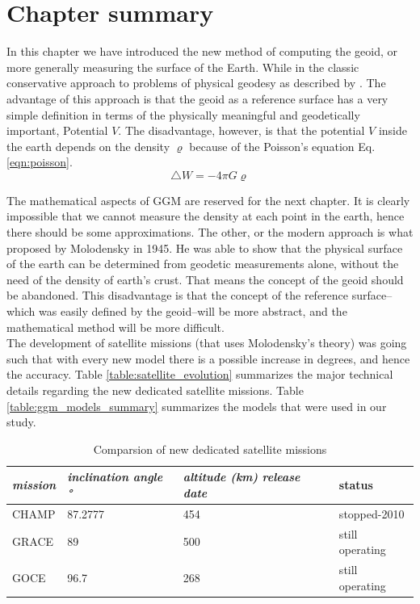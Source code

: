  
 \section{Chapter summary}
 
 In this chapter we have introduced the new method of computing the geoid, or more generally measuring the surface of the Earth. While in the classic conservative approach to problems of physical geodesy as described by \cite{hoffmann}. The advantage of this approach is that the geoid as a reference surface has a very simple definition in terms of the physically meaningful and geodetically important, Potential $V$. The disadvantage, however, is that the potential $V$ inside the earth depends on the  density $\varrho$ because of the Poisson's equation Eq. \eqref{eqn:poisson}. 
 \begin{equation}
 \label{eqn:poisson}
	 \triangle W = - 4 \pi G \varrho
 \end{equation} 
 
 The mathematical aspects of GGM are reserved for the next chapter. It is clearly impossible that we cannot measure the density at each point in the earth, hence there should be some approximations. The other, or the modern approach is what proposed by Molodensky in 1945. He was able to show that the physical surface of the earth can be determined from geodetic measurements alone, without the need of the density of earth's crust. That means the concept of the geoid should be abandoned. This disadvantage is that the concept of the reference surface--which was easily defined by the geoid--will be more abstract, and the mathematical method will be more difficult.
 \\
 The development of satellite missions (that uses Molodensky's theory) was going such that with every new model there is a possible increase in degrees, and hence the accuracy. Table \ref{table:satellite_evolution} summarizes the major technical details regarding the new dedicated satellite missions. Table \ref{table:ggm_models_summary} summarizes the models that were used in our study. 
 
 \begin{table}[]
 	\centering
 	\caption{Comparsion of new dedicated satellite missions}
 	\label{table:dedicated_satellite_missions}
 	\begin{tabular}{@{}llll@{}}
 		\toprule
 		\emph{mission} & \emph{inclination angle \si{\degree}} & \emph{altitude (km)} \emph{release date} & status\\ \midrule
 		
 		CHAMP & 87.2777 & 454 & stopped-2010 \\
 		GRACE & 89 & 500 & still operating\\
 		GOCE & 96.7 & 268& still operating\\ \bottomrule
 		
 	\end{tabular}
 \end{table}
 
